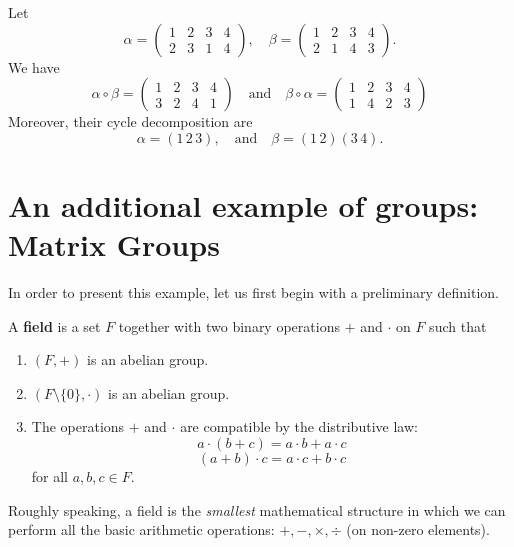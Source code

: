 \documentclass[11pt,a4paper]{article}
\begin{document}
\begin{exa}
    Let \[
\alpha = \begin{pmatrix}
1 & 2 & 3 & 4 \\
2 & 3 & 1 & 4
\end{pmatrix}, \quad 
\beta = \begin{pmatrix}
1 & 2 & 3 & 4 \\
2 & 1 & 4 & 3
\end{pmatrix}.
\]
We have 
    \[
    \alpha \circ \beta = \begin{pmatrix}
    1 & 2 & 3 & 4 \\
    3 & 2 & 4 & 1
    \end{pmatrix}
    \quad\text{and}\quad 
    \beta \circ \alpha = \begin{pmatrix}
    1 & 2 & 3 & 4 \\
    1 & 4 & 2 & 3
    \end{pmatrix} 
    \]
Moreover, their cycle decomposition are \[
    \alpha = (1 \, 2 \, 3), \quad\text{and}\quad  \beta = (1 \, 2)(3 \, 4).
    \]
\item 
\end{exa}


\section{An additional example  of groups: Matrix Groups}

In order to present this example, let us first begin with a preliminary definition.

\begin{defi}
    A \textbf{field} is a set \( F \) together with two binary operations \( + \) and \( \cdot \) on \( F \) such that
\begin{enumerate}[label=(\roman*)]
    \item \( (F, +) \) is an abelian group.
    \item \( (F \setminus \{0\}, \cdot) \) is an abelian group.
    \item The operations \( + \) and \( \cdot \) are compatible by the distributive law:
    \[
    a \cdot (b + c) = a \cdot b + a \cdot c
    \]
    \[
    (a + b) \cdot c = a \cdot c + b \cdot c
    \]
    for all \( a, b, c \in F \).
\end{enumerate}
\end{defi}

Roughly speaking, a field is the \textit{smallest} mathematical structure in which we can perform all the basic arithmetic operations: \( +, -, \times, \div \) (on non-zero elements).
\end{document}
